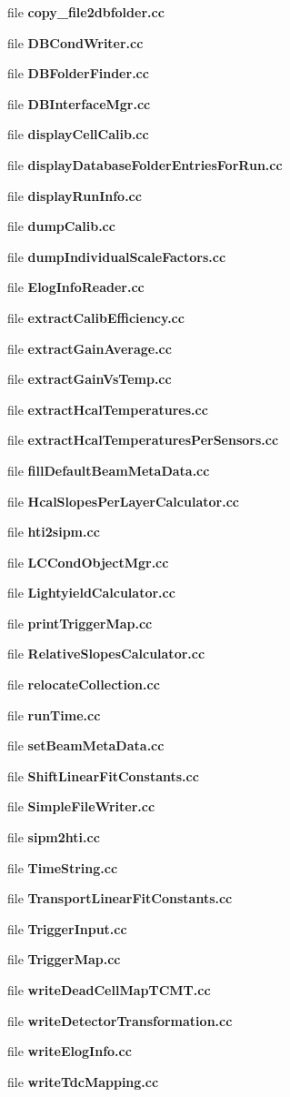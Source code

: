 \begin{DoxyCompactItemize}
\item 
file {\bf copy\-\_\-file2dbfolder.\-cc}
\item 
file {\bfseries D\-B\-Cond\-Writer.\-cc}
\item 
file {\bfseries D\-B\-Folder\-Finder.\-cc}
\item 
file {\bfseries D\-B\-Interface\-Mgr.\-cc}
\item 
file {\bf display\-Cell\-Calib.\-cc}
\item 
file {\bfseries display\-Database\-Folder\-Entries\-For\-Run.\-cc}
\item 
file {\bf display\-Run\-Info.\-cc}
\item 
file {\bf dump\-Calib.\-cc}
\item 
file {\bfseries dump\-Individual\-Scale\-Factors.\-cc}
\item 
file {\bfseries Elog\-Info\-Reader.\-cc}
\item 
file {\bf extract\-Calib\-Efficiency.\-cc}
\item 
file {\bf extract\-Gain\-Average.\-cc}
\item 
file {\bf extract\-Gain\-Vs\-Temp.\-cc}
\item 
file {\bf extract\-Hcal\-Temperatures.\-cc}
\item 
file {\bf extract\-Hcal\-Temperatures\-Per\-Sensors.\-cc}
\item 
file {\bf fill\-Default\-Beam\-Meta\-Data.\-cc}
\item 
file {\bfseries Hcal\-Slopes\-Per\-Layer\-Calculator.\-cc}
\item 
file {\bf hti2sipm.\-cc}
\item 
file {\bfseries L\-C\-Cond\-Object\-Mgr.\-cc}
\item 
file {\bfseries Lightyield\-Calculator.\-cc}
\item 
file {\bf print\-Trigger\-Map.\-cc}
\item 
file {\bfseries Relative\-Slopes\-Calculator.\-cc}
\item 
file {\bf relocate\-Collection.\-cc}
\item 
file {\bf run\-Time.\-cc}
\item 
file {\bf set\-Beam\-Meta\-Data.\-cc}
\item 
file {\bfseries Shift\-Linear\-Fit\-Constants.\-cc}
\item 
file {\bfseries Simple\-File\-Writer.\-cc}
\item 
file {\bf sipm2hti.\-cc}
\item 
file {\bfseries Time\-String.\-cc}
\item 
file {\bfseries Transport\-Linear\-Fit\-Constants.\-cc}
\item 
file {\bfseries Trigger\-Input.\-cc}
\item 
file {\bfseries Trigger\-Map.\-cc}
\item 
file {\bfseries write\-Dead\-Cell\-Map\-T\-C\-M\-T.\-cc}
\item 
file {\bf write\-Detector\-Transformation.\-cc}
\item 
file {\bfseries write\-Elog\-Info.\-cc}
\item 
file {\bf write\-Tdc\-Mapping.\-cc}
\end{DoxyCompactItemize}
